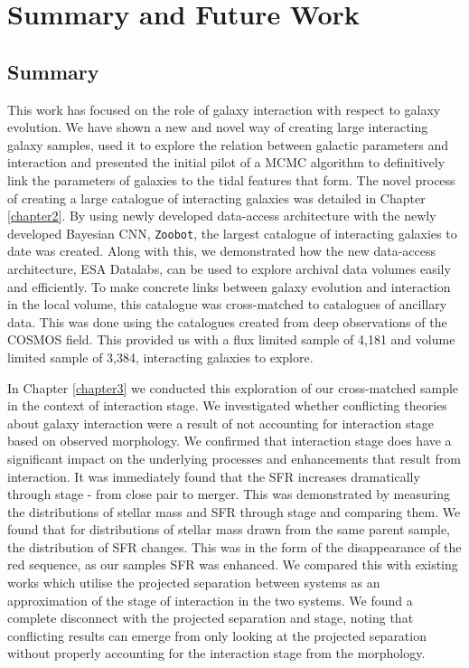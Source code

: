 \chapter{Summary and Future Work}\label{chapter:conclusion}
\section{Summary}
\noindent This work has focused on the role of galaxy interaction with respect to galaxy evolution. We have shown a new and novel way of creating large interacting galaxy samples, used it to explore the relation between galactic parameters and interaction and presented the initial pilot of a MCMC algorithm to definitively link the parameters of galaxies to the tidal features that form. The novel process of creating a large catalogue of interacting galaxies was detailed in Chapter \ref{chapter2}. By using newly developed data-access architecture with the newly developed Bayesian CNN, \texttt{Zoobot}, the largest catalogue of interacting galaxies to date was created. Along with this, we demonstrated how the new data-access architecture, ESA Datalabs, can be used to explore archival data volumes easily and efficiently. To make concrete links between galaxy evolution and interaction in the local volume, this catalogue was cross-matched to catalogues of ancillary data. This was done using the catalogues created from deep observations of the COSMOS field. This provided us with a flux limited sample of 4,181 and volume limited sample of 3,384, interacting galaxies to explore.

In Chapter \ref{chapter3} we conducted this exploration of our cross-matched sample in the context of interaction stage. We investigated whether conflicting theories about galaxy interaction were a result of not accounting for interaction stage based on observed morphology. We confirmed that interaction stage does have a significant impact on the underlying processes and enhancements that result from interaction. It was immediately found that the SFR increases dramatically through stage - from close pair to merger. This was demonstrated by measuring the distributions of stellar mass and SFR through stage and comparing them. We found that for distributions of stellar mass drawn from the same parent sample, the distribution of SFR changes. This was in the form of the disappearance of the red sequence, as our samples SFR was enhanced. We compared this with existing works which utilise the projected separation between systems as an approximation of the stage of interaction in the two systems. We found a complete disconnect with the projected separation and stage, noting that conflicting results can emerge from only looking at the projected separation without properly accounting for the interaction stage from the morphology. 

